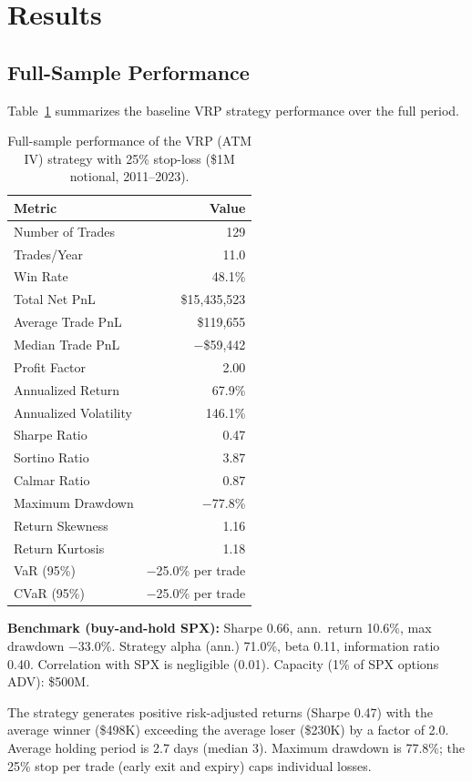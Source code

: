 \documentclass[11pt,a4paper]{article}
\begin{document}
\section{Results}

\subsection{Full-Sample Performance}

Table~\ref{tab:fullsample} summarizes the baseline VRP strategy performance over the full period.

\begin{table}[H]
\centering
\caption{Full-sample performance of the VRP (ATM IV) strategy with 25\% stop-loss (\$1M notional, 2011--2023).}
\label{tab:fullsample}
\begin{tabular}{@{}lr@{}}
\toprule
\textbf{Metric} & \textbf{Value} \\
\midrule
Number of Trades & 129 \\
Trades/Year & 11.0 \\
Win Rate & 48.1\% \\
Total Net PnL & \$15,435,523 \\
Average Trade PnL & \$119,655 \\
Median Trade PnL & $-$\$59,442 \\
Profit Factor & 2.00 \\
Annualized Return & 67.9\% \\
Annualized Volatility & 146.1\% \\
Sharpe Ratio & 0.47 \\
Sortino Ratio & 3.87 \\
Calmar Ratio & 0.87 \\
Maximum Drawdown & $-$77.8\% \\
Return Skewness & 1.16 \\
Return Kurtosis & 1.18 \\
VaR (95\%) & $-$25.0\% per trade \\
CVaR (95\%) & $-$25.0\% per trade \\
\bottomrule
\end{tabular}
\end{table}

\noindent\textbf{Benchmark (buy-and-hold SPX):} Sharpe 0.66, ann.\ return 10.6\%, max drawdown $-$33.0\%. Strategy alpha (ann.) 71.0\%, beta 0.11, information ratio 0.40. Correlation with SPX is negligible (0.01). Capacity (1\% of SPX options ADV): \$500M.

The strategy generates positive risk-adjusted returns (Sharpe 0.47) with the average winner (\$498K) exceeding the average loser (\$230K) by a factor of 2.0.
Average holding period is 2.7 days (median 3). Maximum drawdown is 77.8\%; the 25\% stop per trade (early exit and expiry) caps individual losses.
\end{document}
